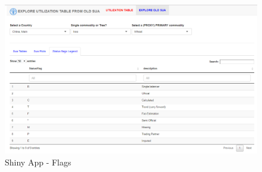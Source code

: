 \documentclass[]{article}
\begin{document}
\begin{figure}[H]

{\centering \includegraphics[width=1\linewidth]{images/UtilizationTable/15_Flags} 

}

\caption{\label{fig:f15}Shiny App - Flags}\label{fig:f15}
\end{figure}
\end{document}
